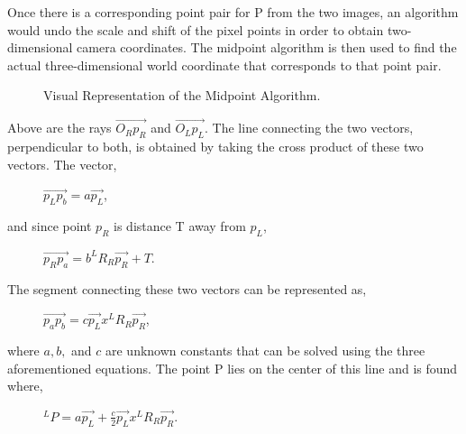 \documentclass[pdftex,10.5pt]{report}
\begin{document}
Once there is a corresponding point pair for P from the two images, an algorithm would undo the scale and shift of the pixel points in order to obtain two-dimensional camera coordinates. The midpoint algorithm is then used to find the actual three-dimensional world coordinate that corresponds to that point pair.

\begin{figure}[H]
	\centering
	\caption{Visual Representation of the Midpoint Algorithm.}
\end{figure}

Above are the rays $\vec{O_{R}p_{R}}$ and $\vec{O_{L}p_{L}}$. The line connecting the two vectors, perpendicular to both, is obtained by taking the cross product of these two vectors. The vector,

\begin{figure}[H]
	\centering
	 $\vec{p_{L}p_{b}} = a\vec{p_{L}}$, 
\end{figure}	 

\noindent and since point $p_{R}$ is distance T away from $p_{L}$, 

\begin{figure}[H]
	\centering
	$\vec{p_{R}p_{a}} = b^{L}R_{R}\vec{p_{R}}+T$. 
\end{figure}	

\noindent The segment connecting these two vectors can be represented as,

\begin{figure}[H]
	\centering
	$\vec{p_{a}p_{b}} = c\vec{p_{L}}x^{L}R_{R}\vec{p_{R}}$,
\end{figure}

\noindent where $a,b,$ and $c$ are unknown constants that can be solved using the three aforementioned equations. The point P lies on the center of this line and is found where,

\begin{figure}[H]
	\centering
 	$^{L}P=a\vec{p_{L}}+\frac{c}{2}\vec{p_{L}}x^{L}R_{R}\vec{p_{R}}$.
 \end{figure}
\end{document}
